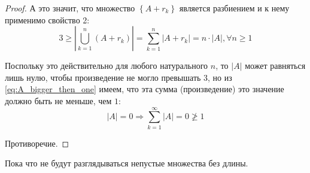 \begin{proof}
    А это значит, что множество $\left\{A+r_k\right\}$ является разбиением
    и к нему применимо свойство 2:
    $$
    3\ge\left|\bigcup_{k=1}^n \left(A+r_k\right)\right|
    =\sum_{k=1}^n \left|A+r_k\right|
    =n\cdot\left|A\right|, \forall n\ge 1$$

    Поспольку это действительно для любого натурального $n$, то
    $\left|A\right|$ может равняться лишь нулю,
    чтобы произведение не могло превышать $3$,
    но из \eqref{eq:A_bigger_then_one} имеем,
    что эта сумма (произведение) это значение должно быть не меньше, чем $1$:
    $$\left|A\right|=0
    \Rightarrow \sum_{k=1}^\infty \left|A\right|=0\not\ge 1$$

    Противоречие.
\end{proof}
Пока что не будут разглядываться непустые множества без длины.
